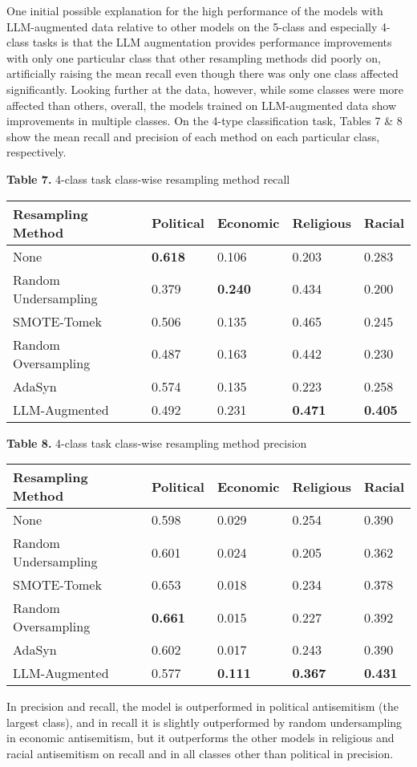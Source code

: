\documentclass[runningheads]{llncs}
\newenvironment{nscenter}
 {\parskip=0pt\par\nopagebreak\centering}
 {\par\noindent\ignorespacesafterend}
\begin{document}
One initial possible explanation for the high performance of the models with LLM-augmented data relative to other models on the 5-class and especially 4-class tasks is that the LLM augmentation provides performance improvements with only one particular class that other resampling methods did poorly on, artificially raising the mean recall even though there was only one class affected significantly. Looking further at the data, however, while some classes were more affected than others, overall, the models trained on LLM-augmented data show improvements in multiple classes. On the 4-type classification task, Tables 7 \& 8 show the mean recall and precision of each method on each particular class, respectively.
\begin{nscenter}
{\bf Table 7.} 4-class task class-wise resampling method recall\\

\begin{tabular}{|l|l|l|l|l|}
\hline
Resampling Method & Political & Economic & Religious & Racial \\\hline
None & {\bf 0.618} & 0.106 & 0.203 & 0.283 \\\hline
Random Undersampling & 0.379 & {\bf 0.240} & 0.434 & 0.200  \\\hline
SMOTE-Tomek & 0.506 & 0.135 & 0.465 & 0.245 \\\hline
Random Oversampling & 0.487 & 0.163 & 0.442 & 0.230 \\\hline
AdaSyn & 0.574 & 0.135 & 0.223 & 0.258 \\\hline
LLM-Augmented & 0.492 & 0.231 & {\bf 0.471} & {\bf 0.405} \\\hline
\end{tabular}

{\bf Table 8.} 4-class task class-wise resampling method precision\\

\begin{tabular}{|l|l|l|l|l|}
\hline
Resampling Method & Political & Economic & Religious & Racial \\\hline
None & 0.598 & 0.029 & 0.254 & 0.390 \\\hline
Random Undersampling & 0.601 & 0.024 & 0.205 & 0.362 \\\hline
SMOTE-Tomek & 0.653 & 0.018 & 0.234 & 0.378 \\\hline
Random Oversampling & {\bf 0.661} & 0.015 & 0.227 & 0.392 \\\hline
AdaSyn & 0.602 & 0.017 & 0.243 & 0.390 \\\hline
LLM-Augmented & 0.577 &{\bf  0.111} & {\bf 0.367} & {\bf 0.431} \\\hline
\end{tabular}
\end{nscenter}
In precision and recall, the model is outperformed in political antisemitism (the largest class), and in recall it is slightly outperformed by random undersampling in economic antisemitism, but it outperforms the other models in religious and racial antisemitism on recall and in all classes other than political in precision.
\end{document}
